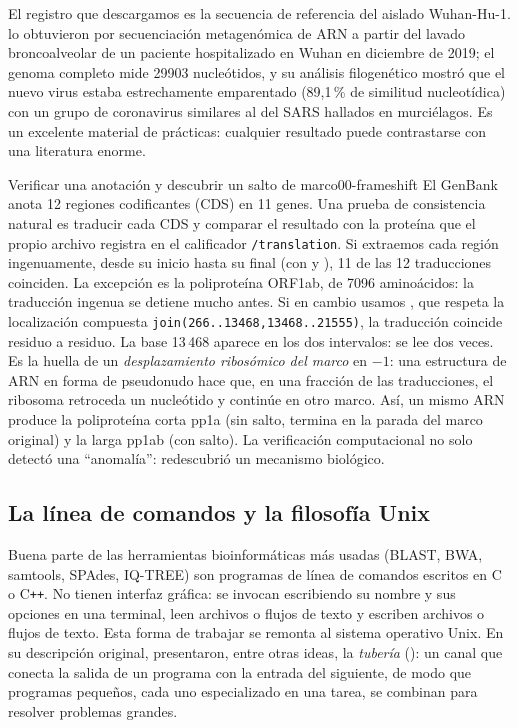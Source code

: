 El registro que descargamos es la secuencia de referencia del aislado Wuhan-Hu-1. \textcite{c00-wu2020} lo obtuvieron por secuenciación metagenómica de ARN a partir del lavado broncoalveolar de un paciente hospitalizado en Wuhan en diciembre de 2019; el genoma completo mide \num{29903} nucleótidos, y su análisis filogenético mostró que el nuevo virus estaba estrechamente emparentado (89,1\,\% de similitud nucleotídica) con un grupo de coronavirus similares al del SARS hallados en murciélagos. Es un excelente material de prácticas: cualquier resultado puede contrastarse con una literatura enorme.

\begin{ejemplo}{Verificar una anotación y descubrir un salto de marco}{00-frameshift}
El GenBank anota 12 regiones codificantes (CDS) en 11 genes. Una prueba de consistencia natural es traducir cada CDS y comparar el resultado con la proteína que el propio archivo registra en el calificador \texttt{/translation}. Si extraemos cada región ingenuamente, desde su inicio hasta su final (con  y ), 11 de las 12 traducciones coinciden. La excepción es la poliproteína ORF1ab, de \num{7096} aminoácidos: la traducción ingenua se detiene mucho antes. Si en cambio usamos , que respeta la localización compuesta \texttt{join(266..13468,13468..21555)}, la traducción coincide residuo a residuo. La base 13\,468 aparece en los dos intervalos: se lee dos veces. Es la huella de un \emph{desplazamiento ribosómico del marco} en $-1$: una estructura de ARN en forma de pseudonudo hace que, en una fracción de las traducciones, el ribosoma retroceda un nucleótido y continúe en otro marco. Así, un mismo ARN produce la poliproteína corta pp1a (sin salto, termina en la parada del marco original) y la larga pp1ab (con salto). La verificación computacional no solo detectó una ``anomalía'': redescubrió un mecanismo biológico.
\end{ejemplo}


\subsection{La línea de comandos y la filosofía Unix}

Buena parte de las herramientas bioinformáticas más usadas (BLAST, BWA, samtools, SPAdes, IQ-TREE) son programas de línea de comandos escritos en C o C\texttt{++}. No tienen interfaz gráfica: se invocan escribiendo su nombre y sus opciones en una terminal, leen archivos o flujos de texto y escriben archivos o flujos de texto. Esta forma de trabajar se remonta al sistema operativo Unix. En su descripción original, \textcite{c00-ritchie1974} presentaron, entre otras ideas, la \emph{tubería} (): un canal que conecta la salida de un programa con la entrada del siguiente, de modo que programas pequeños, cada uno especializado en una tarea, se combinan para resolver problemas grandes.

